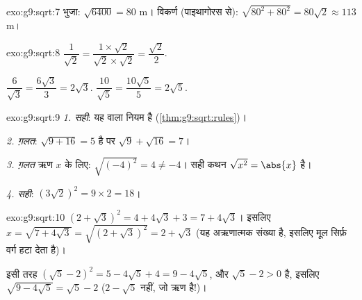 \begin{solution}{exo:g9:sqrt:7}
भुजा: $\sqrt{6400} = 80$ m। विकर्ण (पाइथागोरस से):
$\sqrt{80^2 + 80^2} = 80\sqrt2 \approx 113$ m।
\end{solution}

\begin{solution}{exo:g9:sqrt:8}
$\dfrac{1}{\sqrt2} = \dfrac{1 \times \sqrt2}{\sqrt2 \times \sqrt2}
= \dfrac{\sqrt2}{2}$.

$\dfrac{6}{\sqrt3} = \dfrac{6\sqrt3}{3} = 2\sqrt3$.
\quad
$\dfrac{10}{\sqrt5} = \dfrac{10\sqrt5}{5} = 2\sqrt5$.
\end{solution}

\begin{solution}{exo:g9:sqrt:9}
\emph{1. सही}: यह  वाला नियम है (\cref{thm:g9:sqrt:rules})।

\emph{2. ग़लत}: $\sqrt{9 + 16} = 5$ है पर $\sqrt9 + \sqrt{16} = 7$।

\emph{3. ग़लत} ऋण $x$ के लिए: $\sqrt{(-4)^2} = 4 \neq -4$। सही कथन
$\sqrt{x^2} = \abs{x}$ है।

\emph{4. सही}: $\left(3\sqrt2\right)^2 = 9 \times 2 = 18$।
\end{solution}

\begin{solution}{exo:g9:sqrt:10}
$\left(2 + \sqrt3\right)^2 = 4 + 4\sqrt3 + 3 = 7 + 4\sqrt3$। इसलिए
$x = \sqrt{7 + 4\sqrt3} = \sqrt{\left(2+\sqrt3\right)^2} = 2 + \sqrt3$
(यह अऋणात्मक संख्या है, इसलिए मूल सिर्फ़ वर्ग हटा देता है)।

इसी तरह $\left(\sqrt5 - 2\right)^2 = 5 - 4\sqrt5 + 4 = 9 - 4\sqrt5$,
और $\sqrt5 - 2 > 0$ है, इसलिए
$\sqrt{9 - 4\sqrt5} = \sqrt5 - 2$ ($2 - \sqrt5$ नहीं, जो ऋण
है!)।
\end{solution}

